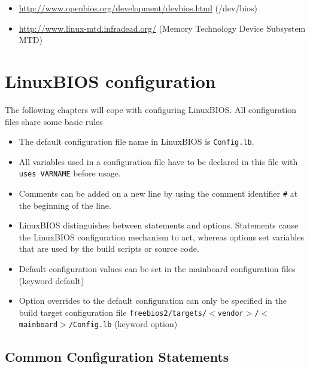 \documentclass[titlepage,12pt]{article}
\begin{document}
\begin{itemize}
\item \url{http://www.openbios.org/development/devbios.html} (/dev/bios)
\item \url{http://www.linux-mtd.infradead.org/} (Memory Technology Device Subsystem MTD)
\end{itemize}

\newpage

%
%

\section{LinuxBIOS configuration}
The following chapters will cope with configuring LinuxBIOS. All
configuration files share some basic rules
\begin{itemize}
\item
The default configuration file name in LinuxBIOS is \texttt{Config.lb}.
\item 
All variables used in a configuration file have to be declared in this
file with \texttt{uses VARNAME} before usage.
\item
Comments can be added on a new line by using the comment identifier
\texttt{\#} at the beginning of the line.
\item
LinuxBIOS distinguishes between statements and options. Statements cause
the LinuxBIOS configuration mechanism to act, whereas options set
variables that are used by the build scripts or source code.
\item 
Default configuration values can be set in the mainboard configuration
files (keyword default)
\item 
Option overrides to the default configuration can only be specified in
the build target configuration file
\texttt{freebios2/targets/$<$vendor$>$/$<$mainboard$>$/Config.lb} 
(keyword option)
\end{itemize}

\subsection{Common Configuration Statements}
\end{document}

